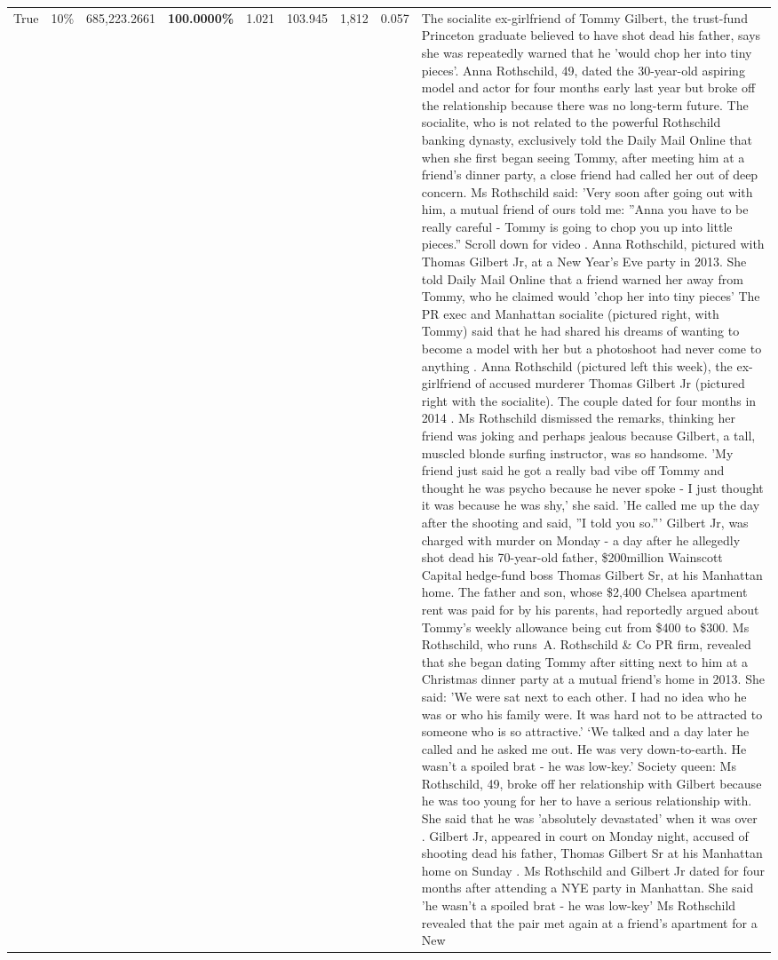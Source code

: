 \begin{table}[H]
\begin{tabular}{lllrlllll}
True & 10\% & 685,223.2661 & \bfseries \color{red} 100.0000\% & 1.021 & 103.945 & 1,812 & 0.057 & The socialite ex-girlfriend of Tommy Gilbert, the trust-fund Princeton graduate believed to have shot dead his father, says she was repeatedly warned that he 'would chop her into tiny pieces'. Anna Rothschild, 49, dated the 30-year-old aspiring model and actor for four months early last year but broke off the relationship because there was no long-term future. The socialite, who is not related to the powerful Rothschild banking dynasty, exclusively told the Daily Mail Online that when she first began seeing Tommy, after meeting him at a friend's dinner party, a close friend had called her out of deep concern. Ms Rothschild said: 'Very soon after going out with him, a mutual friend of ours told me: ''Anna you have to be really careful - Tommy is going to chop you up into little pieces.'' Scroll down for video . Anna Rothschild, pictured with Thomas Gilbert Jr, at a New Year's Eve party in 2013. She told Daily Mail Online that a friend warned her away from Tommy, who he claimed would 'chop her into tiny pieces' The PR exec and Manhattan socialite (pictured right, with Tommy) said that he had shared his dreams of wanting to become a model with her but a photoshoot had never come to anything . Anna Rothschild (pictured left this week), the ex-girlfriend of accused murderer Thomas Gilbert Jr (pictured right with the socialite). The couple dated for four months in 2014 . Ms Rothschild dismissed the remarks, thinking her friend was joking and perhaps jealous because Gilbert, a tall, muscled blonde surfing instructor, was so handsome. 'My friend just said he got a really bad vibe off Tommy and thought he was psycho because he never spoke - I just thought it was because he was shy,' she said. 'He called me up the day after the shooting and said, ''I told you so.''' Gilbert Jr, was charged with murder on Monday - a day after he allegedly shot dead his 70-year-old father, \$200million Wainscott Capital hedge-fund boss Thomas Gilbert Sr, at his Manhattan home. The father and son, whose \$2,400 Chelsea apartment rent was paid for by his parents, had reportedly argued about Tommy's weekly allowance being cut from \$400 to \$300. Ms Rothschild, who runs A. Rothschild \& Co PR firm, revealed that she began dating Tommy after sitting next to him at a Christmas dinner party at a mutual friend's home in 2013. She said: 'We were sat next to each other. I had no idea who he was or who his family were. It was hard not to be attracted to someone who is so attractive.' ‘We talked and a day later he called and he asked me out. He was very down-to-earth. He wasn’t a spoiled brat - he was low-key.’ Society queen: Ms Rothschild, 49, broke off her relationship with Gilbert because he was too young for her to have a serious relationship with. She said that he was 'absolutely devastated' when it was over . Gilbert Jr, appeared in court on Monday night, accused of shooting dead his father, Thomas Gilbert Sr at his Manhattan home on Sunday . Ms Rothschild and Gilbert Jr dated for four months after attending a NYE party in Manhattan. She said 'he wasn't a spoiled brat - he was low-key' Ms Rothschild revealed that the pair met again at a friend’s apartment for a New 
\end{tabular}
\end{table}
